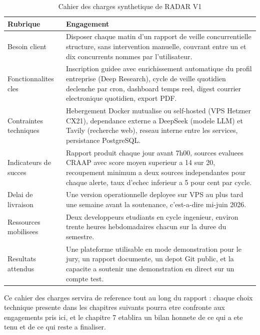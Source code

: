 \documentclass[12pt,a4paper,openany]{report}
\begin{document}
\begin{table}[H]
  \centering
  \caption{Cahier des charges synthetique de RADAR V1}
  \label{tab:cahier-charges}
  \small
  \begin{tabularx}{\linewidth}{lY}
    \toprule
    \textbf{Rubrique} & \textbf{Engagement} \\
    \midrule
    Besoin client & Disposer chaque matin d'un rapport de veille concurrentielle structure, sans intervention manuelle, couvrant entre un et dix concurrents nommes par l'utilisateur. \\
    Fonctionnalites cles & Inscription guidee avec enrichissement automatique du profil entreprise (Deep Research), cycle de veille quotidien declenche par cron, dashboard temps reel, digest courrier electronique quotidien, export PDF. \\
    Contraintes techniques & Hebergement Docker mutualise ou self-hosted (VPS Hetzner CX21), dependance externe a DeepSeek (modele LLM) et Tavily (recherche web), reseau interne entre les services, persistance PostgreSQL. \\
    Indicateurs de succes & Rapport produit chaque jour avant 7h00, sources evaluees CRAAP avec score moyen superieur a 14 sur 20, recoupement minimum a deux sources independantes pour chaque alerte, taux d'echec inferieur a 5 pour cent par cycle. \\
    Delai de livraison & Une version operationnelle deployee sur VPS au plus tard une semaine avant la soutenance, c'est-a-dire mi-juin 2026. \\
    Ressources mobilisees & Deux developpeurs etudiants en cycle ingenieur, environ trente heures hebdomadaires chacun sur la duree du semestre. \\
    Resultats attendus & Une plateforme utilisable en mode demonstration pour le jury, un rapport documente, un depot Git public, et la capacite a soutenir une demonstration en direct sur un compte test. \\
    \bottomrule
  \end{tabularx}
\end{table}

Ce cahier des charges servira de reference tout au long du rapport : chaque choix technique presente dans les chapitres suivants pourra etre confronte aux engagements pris ici, et le chapitre 7 etablira un bilan honnete de ce qui a ete tenu et de ce qui reste a finaliser.

\end{document}
